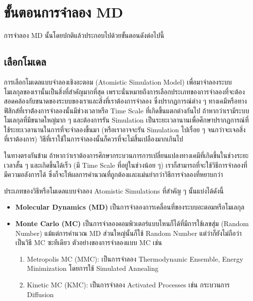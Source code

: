 \section{ขั้นตอนการจำลอง MD}

การจำลอง MD นั้นโดยปกติแล้วประกอบไปด้วยขั้นตอนดังต่อไปนี้

\subsection{เลือกโมเดล}

การเลือกโมเดลแบบจำลองเชิงอะตอม (Atomistic Simulation Model) เพื่อมาจำลองระบบโมเลกุลของเรานั้นเป็นสิ่งที่สำคัญมากที่สุด เพราะนั่นหมายถึงการเลือกประเภทของการจำลองที่จะต้องสอดคล้องกับขนาดของระบบของเราและสิ่งที่เราต้องการจำลอง ซึ่งปรากฏการณ์ต่าง ๆ ทางเคมีหรือทางฟิสิกส์ที่เราต้่องการจำลองนั้นมีช่วงเวลาหรือ Time Scale ที่เกิดขึ้นแตกต่างกันไป ถ้าหากว่าเรามีระบบโมเลกุลที่มีขนาดใหญ่มาก ๆ และต้องการรัน Simulation เป็นระยะเวลานานเพื่อศึกษาปรากฏการณ์ที่ใช้ระยะเวลานานในการที่จะจำลองขึ้นมา (หรือเราอาจจะรัน Simulation ไปเรื่อย ๆ จนกว่าจะเจอสิ่งที่เราต้องการ) วิธีที่เราใช้ในการจำลองนั้นก็ควรที่จะไม่สิ้นเปลืองมากเกินไป

ในทางตรงกันข้าม ถ้าหากว่าเราต้องการศึกษากระบวนการการเปลี่ยนแปลงทางเคมีที่เกิดขึ้นในช่วงระยะเวลาสั้น ๆ และเกิดขึ้นได้เร็ว (มี Time Scale ที่อยู่ในช่วงน้อย ๆ) เราก็สามารถที่จะใช้วิธีการจำลองที่มีความอลังการได้ ซึ่งก็จะให้ผลการคำนวณที่ถูกต้องและแม่นยำกว่าวิธีการจำลองที่หยาบกว่า

ประเภทของวิธีหรือโมเดลแบบจำลอง Atomistic Simulations ที่สำคัญ ๆ นั้นแบ่งได้ดังนี้
%
\begin{itemize}[topsep=0pt,noitemsep]
    \setlength\itemsep{0.5em}
    \item \textbf{Molecular Dynamics (MD)} เป็นการจำลองการเคลื่อนที่ของระบบอะตอมหรือโมเลกุล

    \item \textbf{Monte Carlo (MC)} เป็นการจำลองคอมพิวเตอร์แบบไหนก็ได้ที่มีการใช้เลขสุ่ม (Random Number) แม้แต่การคำนวณ MD ส่วนใหญ่นั้นก็ใช้ Random Number แต่ว่าก็ยังไม่ถือว่าเป็นวิธี MC ซะทีเดียว ตัวอย่างของการจำลองแบบ MC เช่น
    \begin{enumerate}[topsep=0pt,noitemsep]
        \setlength\itemsep{0.5em}
        \item Metropolis MC (MMC): เป็นการจำลอง Thermodynamic Ensemble, Energy Minimization โดยการใช้ Simulated Annealing

        \item Kinetic MC (KMC): เป็นการจำลอง Activated Processes เช่น กระบวนการ Diffusion
        \end{enumerate}
\end{itemize}

